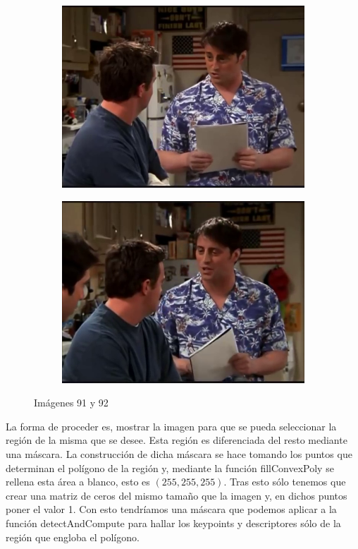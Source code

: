 \documentclass[12pt,a4paper]{article}
\begin{document}
\begin{figure}[H]
  \centering
    \begin{subfigure}{0.45\textwidth}
      \includegraphics[scale=0.33]{./Imagenes/91.png}
    \end{subfigure}
    \begin{subfigure}{0.45\textwidth}
      \includegraphics[scale=0.33]{./Imagenes/92.png}
    \end{subfigure}
    \caption{Imágenes 91 y 92}
\end{figure}

La forma de proceder es, mostrar la imagen para que se pueda seleccionar la región de la misma que se desee. Esta región es diferenciada del resto mediante una máscara. La construcción de dicha máscara se hace tomando los puntos que determinan el polígono de la región y, mediante la función fillConvexPoly se rellena esta área a blanco, esto es $(255,255,255)$. Tras esto sólo tenemos que crear una matriz de ceros del mismo tamaño que la imagen y, en dichos puntos poner el valor 1. Con esto tendríamos una máscara que podemos aplicar a la función detectAndCompute para hallar los keypoints y descriptores sólo de la región que engloba el polígono.
\end{document}
